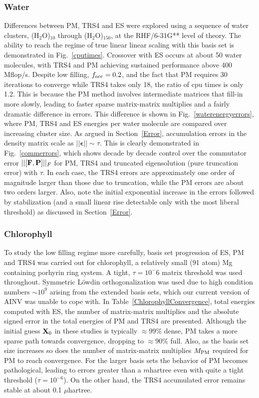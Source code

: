 \commentoutA{\documentclass[prb,aps,twocolumn,twocolumngrid,secnumarabic]{revtex4}}
\begin{document}
\subsubsection{Water}

Differences between PM, TRS4 and ES were explored using a sequence of water clusters\cite{WaterCluster},
(H$_2$O)$_{10}$ through (H$_2$O)$_{150}$, at the RHF/6-31G** level of theory.  The ability to
reach the regime of true linear linear scaling with this basis set is demonstrated in Fig.~\ref{cputimes}.
Crossover with ES occurs at about 50 water molecules, with {\sc TRS4} and {\sc PM} achieving sustained 
performance above 400 Mflop/s.  Despite low filling, $f_{\rm occ}=0.2$, and the fact that PM 
requires 30 iterations to converge while TRS4 takes only 18, the ratio of cpu times is only 1.2.  
This is because the PM method involves intermediate matrices that fill-in more slowly, leading to 
faster sparse matrix-matrix multiplies and a fairly dramatic difference in errors.  
This difference is shown in Fig.~\ref{waterenergyerrors}, where PM, TRS4 and ES energies per water molecule 
are compared over increasing cluster size.  As argued in Section~\ref{Error}, accumulation errors 
in the density matrix scale as $||{\bm\epsilon}||\sim \tau$. This is clearly demonstrated in 
Fig.~\ref{commerrors}, which shows decade by decade control over the commutator error 
$||[{\bf F,P}]||_F$ for PM, TRS4 and truncated eigensolution (pure truncation error) with $\tau$. 
In each case, the TRS4 errors are approximately one order of magnitude larger than those due to 
truncation, while the PM errors are about two orders larger.  Also, note the initial exponential  
increase in the errors followed by stabilization (and a small linear rise detectable only with the 
most liberal threshold) as discussed in Section~\ref{Error}.

\subsubsection{Chlorophyll}
 

To study the low filling regime more carefully, basis set progression of ES, PM 
and TRS4 was carried out for chlorophyll, a relatively small (91 atom) Mg containing porhyrin ring system. 
A tight,  $\tau=10^-6$ matrix threshold was used throughout.  Symmetric L\"owdin orthogonalization 
was used due to high condition numbers $\sim 10^9$ arising from the extended basis sets, which 
our current version of AINV was unable to cope with.  In Table~\ref{ChlorophyllConvergence}, 
total energies computed with ES, the number of matrix-matrix multiplies and the absolute signed 
error in the total energies of PM and TRS4 are presented.  Although the initial guess ${\bf X}_0$ 
in these studies is typically $\approx 99\%$ dense, PM takes a more sparse path towards convergence, 
dropping to $\approx 90\%$ full.  Also, as the basis set size increases so does the number 
of matrix-matrix multiplies $M_{\rm PM}$ required for PM to reach convergence. For the 
larger basis sets the behavior of PM becomes pathological,  leading to errors greater 
than a $m$hartree even with quite a tight threshold ($\tau=10^{-6}$).  On the other hand, 
the TRS4 accumulated error remains stable at about 0.1 $\mu$hartree.
\end{document}
